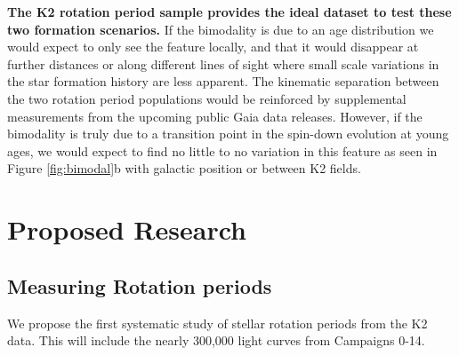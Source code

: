 \documentclass[12pt]{article}
\newcommand{\racomment}[1]{{\color{red}#1}}
\begin{document}
{\bf The K2 rotation period sample provides the ideal dataset to test these two formation scenarios.} If the bimodality is due to an age distribution we would expect to only see the feature locally, and that it would disappear at further distances or along different lines of sight where small scale variations in the star formation history are less apparent. The kinematic separation between the two rotation period populations would be reinforced by supplemental measurements from the upcoming public Gaia data releases. However, if the bimodality is truly due to a transition point in the spin-down evolution at young ages, we would expect to find no little to no variation in this feature as seen in Figure \ref{fig:bimodal}b with galactic position or between K2 fields.






\section{Proposed Research}
\subsection{Measuring Rotation periods}
We propose the first systematic study of stellar rotation periods from the K2
data. This will include the nearly 300,000 light curves from Campaigns 0-14.
\end{document}
